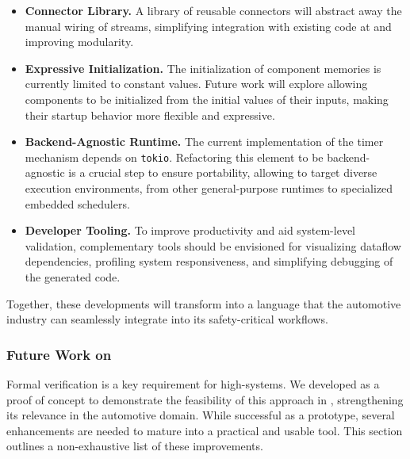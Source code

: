 \begin{itemize}
    \item \textbf{Connector Library.} A library of reusable connectors will abstract away
          the manual wiring of streams, simplifying integration with existing \Rust code
          at \ampere and improving modularity.

    \item \textbf{Expressive Initialization.} The initialization of component memories is
          currently limited to constant values. Future work will explore allowing
          components to be initialized from the initial values of their inputs,
          making their startup behavior more flexible and expressive.

    \item \textbf{Backend-Agnostic Runtime.} The current implementation of the timer
          mechanism depends on \texttt{tokio}. Refactoring this element to be
          backend-agnostic is a crucial step to ensure portability, allowing \GRust to
          target diverse execution environments, from other general-purpose runtimes to
          specialized embedded schedulers.

    \item \textbf{Developer Tooling.} To improve productivity and aid system-level
          validation, complementary tools should be envisioned for visualizing dataflow
          dependencies, profiling system responsiveness, and simplifying debugging of the
          generated code.
\end{itemize}

Together, these developments will transform \GRust into a language that the automotive industry can
seamlessly integrate into its safety-critical workflows.

\subsubsection{Future Work on \GReusot}
\label{sec:grust:greusot:future}

Formal verification is a key requirement for high-\Asil systems. We developed \GReusot as a proof of
concept to demonstrate the feasibility of this approach in \GRust, strengthening its relevance in
the automotive domain. While successful as a prototype, several enhancements are needed to mature
\GReusot into a practical and usable tool. This section outlines a non-exhaustive list of these
improvements.

